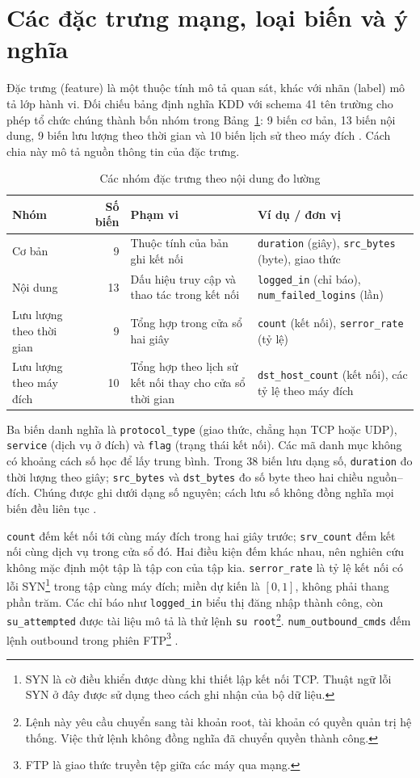 \documentclass[../main.tex]{subfiles}
\begin{document}
\section{Các đặc trưng mạng, loại biến và ý nghĩa}
Đặc trưng (feature) là một thuộc tính mô tả quan sát, khác với nhãn (label) mô tả lớp hành vi. Đối chiếu bảng định nghĩa KDD với schema 41 tên trường cho phép tổ chức chúng thành bốn nhóm trong Bảng~\ref{tab:chuong2:features}: 9 biến cơ bản, 13 biến nội dung, 9 biến lưu lượng theo thời gian và 10 biến lịch sử theo máy đích \cite{task2_kdd1999,task1_schema1999}. Cách chia này mô tả nguồn thông tin của đặc trưng.
\begin{table}[H]\centering
\caption{Các nhóm đặc trưng theo nội dung đo lường}
\label{tab:chuong2:features}
\small\setlength{\tabcolsep}{4pt}
\begin{tabular}{>{\raggedright\arraybackslash}p{3cm}r>{\raggedright\arraybackslash}p{4.5cm}>{\raggedright\arraybackslash}p{5.2cm}}\toprule
Nhóm & Số biến & Phạm vi & Ví dụ / đơn vị\\\midrule
Cơ bản & 9 & Thuộc tính của bản ghi kết nối & \texttt{duration} (giây), \texttt{src\_bytes} (byte), giao thức\\
Nội dung & 13 & Dấu hiệu truy cập và thao tác trong kết nối & \texttt{logged\_in} (chỉ báo), \texttt{num\_failed\_logins} (lần)\\
Lưu lượng theo thời gian & 9 & Tổng hợp trong cửa sổ hai giây & \texttt{count} (kết nối), \texttt{serror\_rate} (tỷ lệ)\\
Lưu lượng theo máy đích & 10 & Tổng hợp theo lịch sử kết nối thay cho cửa sổ thời gian & \texttt{dst\_host\_count} (kết nối), các tỷ lệ theo máy đích\\
\bottomrule\end{tabular}\end{table}
Ba biến danh nghĩa là \texttt{protocol\_type} (giao thức, chẳng hạn TCP hoặc UDP), \texttt{service} (dịch vụ ở đích) và \texttt{flag} (trạng thái kết nối). Các mã danh mục không có khoảng cách số học để lấy trung bình. Trong 38 biến lưu dạng số, \texttt{duration} đo thời lượng theo giây; \texttt{src\_bytes} và \texttt{dst\_bytes} đo số byte theo hai chiều nguồn--đích. Chúng được ghi dưới dạng số nguyên; cách lưu số không đồng nghĩa mọi biến đều liên tục \cite{task2_kdd1999,task1_schema1999}.

\texttt{count} đếm kết nối tới cùng máy đích trong hai giây trước; \texttt{srv\_count} đếm kết nối cùng dịch vụ trong cửa sổ đó. Hai điều kiện đếm khác nhau, nên nghiên cứu không mặc định một tập là tập con của tập kia. \texttt{serror\_rate} là tỷ lệ kết nối có lỗi SYN\footnote{SYN là cờ điều khiển được dùng khi thiết lập kết nối TCP. Thuật ngữ lỗi SYN ở đây được sử dụng theo cách ghi nhận của bộ dữ liệu.} trong tập cùng máy đích; miền dự kiến là $[0,1]$, không phải thang phần trăm. Các chỉ báo như \texttt{logged\_in} biểu thị đăng nhập thành công, còn \texttt{su\_attempted} được tài liệu mô tả là thử lệnh \texttt{su root}\footnote{Lệnh này yêu cầu chuyển sang tài khoản root, tài khoản có quyền quản trị hệ thống. Việc thử lệnh không đồng nghĩa đã chuyển quyền thành công.}. \texttt{num\_outbound\_cmds} đếm lệnh outbound trong phiên FTP\footnote{FTP là giao thức truyền tệp giữa các máy qua mạng.} \cite{task2_kdd1999}.
\end{document}
